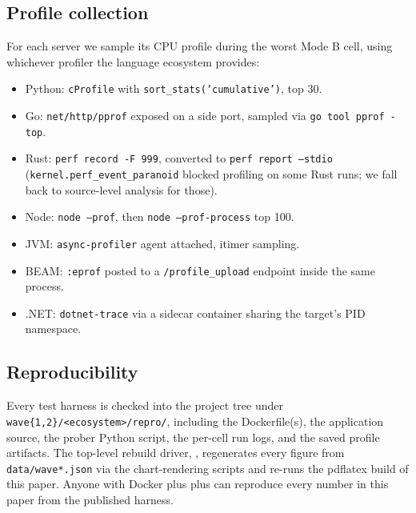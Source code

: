\subsection{Profile collection}
\label{sec:method-profile}

For each server we sample its CPU profile during the worst Mode B
cell, using whichever profiler the language ecosystem provides:

\begin{itemize}
  \item Python: \texttt{cProfile} with \texttt{sort\_stats('cumulative')},
    top 30.
  \item Go: \texttt{net/http/pprof} exposed on a side port, sampled
    via \texttt{go tool pprof -top}.
  \item Rust: \texttt{perf record -F 999}, converted to
    \texttt{perf report --stdio} (\texttt{kernel.perf\_event\_paranoid}
    blocked profiling on some Rust runs; we fall back to
    source-level analysis for those).
  \item Node: \texttt{node --prof}, then
    \texttt{node --prof-process} top 100.
  \item JVM: \texttt{async-profiler} agent attached, itimer
    sampling.
  \item BEAM: \texttt{:eprof} posted to a \texttt{/profile\_upload}
    endpoint inside the same process.
  \item .NET: \texttt{dotnet-trace} via a sidecar container
    sharing the target's PID namespace.
\end{itemize}

\subsection{Reproducibility}
\label{sec:method-repro}

Every test harness is checked into the project tree under
\texttt{wave\{1,2\}/<ecosystem>/repro/}, including the
Dockerfile(s), the application source, the prober Python script,
the per-cell run logs, and the saved profile artifacts. The
top-level rebuild driver,
, regenerates every figure from
\texttt{data/wave*.json} via the chart-rendering scripts and
re-runs the pdflatex build of this paper. Anyone with Docker plus
 plus  can reproduce every number in
this paper from the published harness.
